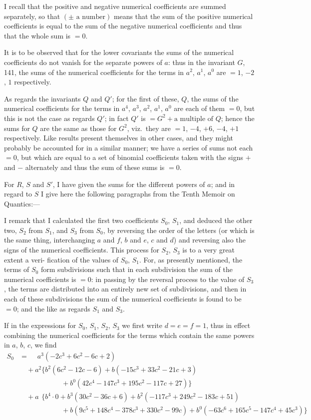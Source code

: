 \documentclass[11pt,a4paper]{article}
\begin{document}
I recall that the positive and negative numerical coefficients are summed separately, so that $(\pm\text{ a number})$
means that the sum of the positive numerical coefficients is equal to the sum of the
negative numerical coefficients and thus that the whole sum is $=0$.

It is to be observed that for the lower covariants the sums of the numerical
coefficients do not vanish for the separate powers of $a$: thus in the invariant $G$, 141,
the sums of the numerical coefficients for the terms in $a^2$, $a^1$, $a^0$ are $=1$, $-2$, $1$
respectively.

As regards the invariants $Q$ and $Q'$; for the first of these, $Q$, the sums of the
numerical coefficients for the terms in $a^4$, $a^3$, $a^2$, $a^1$, $a^0$ are each of them $=0$, but this
is not the case as regards $Q'$; in fact $Q'$ is $=G^2+\text{a multiple of }Q$; hence the sums
for $Q$ are the same as those for $G^2$, viz.\ they are $=1$, $-4$, $+6$, $-4$, $+1$ respectively.
Like results present themselves in other cases, and they might probably be accounted
for in a similar manner; we have a series of sums not each $=0$, but which are equal
to a set of binomial coefficients taken with the signs $+$ and $-$ alternately and thus
the sum of these sums is $=0$.

For $R$, $S$ and $S'$, I have given the sums for the different powers of $a$; and
in regard to $S$ I give here the following paragraphs from the Tenth Memoir on
Quantics:---

I remark that I calculated the first two coefficients $S_0$, $S_1$, and deduced the other
two, $S_2$ from $S_1$, and $S_3$ from $S_0$, by reversing the order of the letters (or which is
the same thing, interchanging $a$ and $f$, $b$ and $e$, $c$ and $d$) and reversing also the signs
of the numerical coefficients. This process for $S_2$, $S_3$ is to a very great extent a veri-
fication of the values of $S_0$, $S_1$. For, as presently mentioned, the terms of $S_0$ form
subdivisions such that in each subdivision the sum of the numerical coefficients is
$=0$: in passing by the reversal process to the value of $S_3$, the terms are distributed
into an entirely new set of subdivisions, and then in each of these subdivisions the
sum of the numerical coefficients is found to be $=0$; and the like as regards $S_1$ and $S_3$.

If in the expressions for $S_0$, $S_1$, $S_2$, $S_3$ we first write $d=e=f=1$, thus in effect
combining the numerical coefficients for the terms which contain the same powers in
$a$, $b$, $c$, we find
\begin{align*}
S_0 &= \phantom{+}a^3(-2c^3 + 6c^2 - 6c + 2)\\
  &\quad + a^2\{b^2(6c^2 - 12c - 6) + b(-15c^3 + 33c^2 - 21c + 3)\\
  &\qquad\qquad\qquad + b^0(42c^4 - 147c^3 + 195c^2 - 117c + 27)\}\\
  &\quad + a\phantom{^2}\{b^4\cdot 0 + b^3(30c^2 - 36c + 6) + b^2(-117c^3 + 249c^2 - 183c + 51)\\
  &\qquad\qquad\qquad + b(9c^5 + 148c^4 - 378c^3 + 330c^2 - 99c) + b^0(-63c^6 + 165c^5 - 147c^4 + 45c^3)\}
\end{align*}
\end{document}
